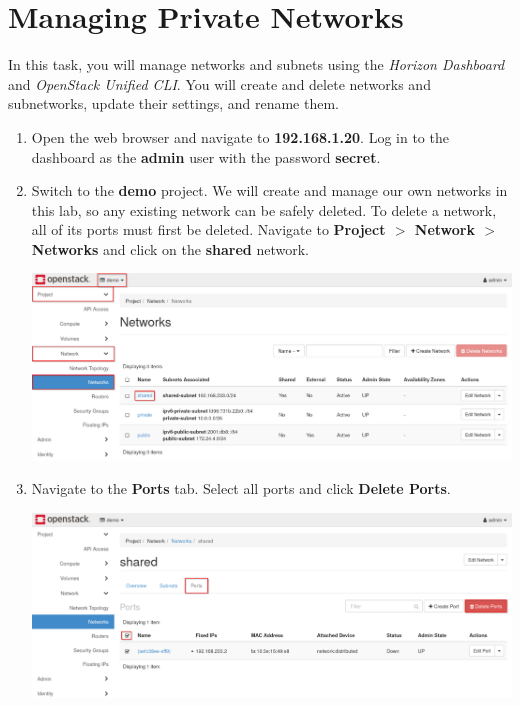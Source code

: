 \documentclass[letterpaper, 12pt]{article}
\begin{document}
\section{Managing Private Networks}
\label{sec:managing_private_networks}
In this task, you will manage networks and subnets using the \textit{Horizon Dashboard} and \textit{OpenStack
Unified CLI}. You will create and delete networks and subnetworks, update their settings, and rename them.

\begin{enumerate}
    \item Open the web browser and navigate to \textbf{192.168.1.20}. Log in to the dashboard as the \textbf{admin} user
    with the password \textbf{secret}.

    \item Switch to the \textbf{demo} project. We will create and manage our own networks in this lab, so any existing
    network can be safely deleted. To delete a network, all of its ports must first be deleted. Navigate to
    \textbf{Project $>$ Network $>$ Networks} and click on the \textbf{shared} network.

    \begin{center}
        \includegraphics[width=\linewidth]{images/part3/step2.png}
    \end{center}

    \item Navigate to the \textbf{Ports} tab. Select all ports and click \textbf{Delete Ports}.

    \begin{center}
        \includegraphics[width=\linewidth]{images/part3/step3.png}
    \end{center}


\end{enumerate}
\end{document}
